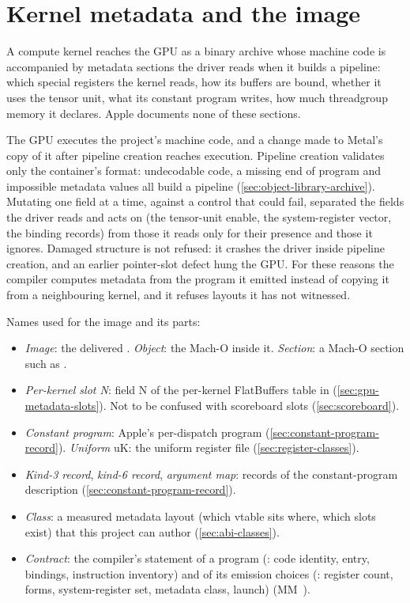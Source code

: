 \chapter{Kernel metadata and the image}\label{ch:kernel-metadata-image}

A compute kernel reaches the GPU as a binary archive whose machine code is accompanied by metadata
sections the driver reads when it builds a pipeline: which special registers the kernel reads, how its buffers are
bound, whether it uses the tensor unit, what its constant program writes, how much threadgroup memory it declares.
Apple documents none of these sections.

The GPU executes the project's machine code, and a change made to Metal's copy of it after pipeline creation reaches
execution. Pipeline creation validates only the container's format: undecodable code, a missing end of program and
impossible metadata values all build a pipeline (\cref{sec:object-library-archive}). Mutating one field at a time,
against a control that could fail, separated the fields the driver reads and acts on (the tensor-unit enable, the
system-register vector, the binding records) from those it reads only for their presence and those it ignores.
Damaged structure is not refused: it crashes the driver inside pipeline creation, and an earlier pointer-slot defect
hung the GPU. For these reasons the compiler computes metadata from the program it emitted instead of copying it from a
neighbouring kernel, and it refuses layouts it has not witnessed.

Names used for the image and its parts:

\begin{itemize}
\item \emph{Image}: the delivered . \emph{Object}: the  Mach-O inside it. \emph{Section}: a Mach-O section
  such as .
\item \emph{Per-kernel slot N}: field N of the per-kernel FlatBuffers table in  (\cref{sec:gpu-metadata-slots}). Not to be
  confused with scoreboard slots (\cref{sec:scoreboard}).
\item \emph{Constant program}: Apple's per-dispatch program  (\cref{sec:constant-program-record}). \emph{Uniform} uK: the
  uniform register file (\cref{sec:register-classes}).
\item \emph{Kind-3 record}, \emph{kind-6 record}, \emph{argument map}: records of the constant-program description (\cref{sec:constant-program-record}).
\item \emph{Class}: a measured metadata layout (which vtable sits where, which slots exist) that this project can author
  (\cref{sec:abi-classes}).
\item \emph{Contract}: the compiler's statement of a program (: code identity, entry, bindings, instruction
  inventory) and of its emission choices (: register count, forms, system-register set, metadata class,
  launch) (MM~).
\end{itemize}

